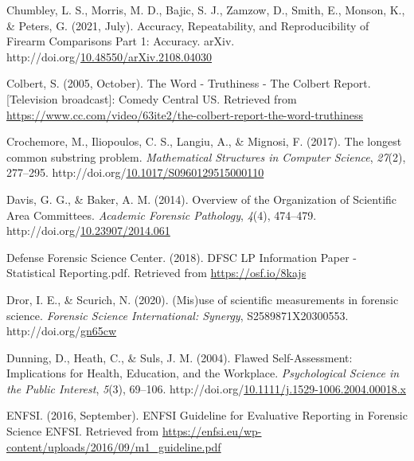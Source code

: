 \documentclass[print]{nuthesis}
\newlength{\cslhangindent}
\newenvironment{CSLReferences}[2]%
{\setlength{\parindent}{0pt}%
\everypar{\setlength{\hangindent}{\cslhangindent}}\ignorespaces}%
{\par}
\begin{document}
\begin{CSLReferences}{1}{0}
\leavevmode{}%
Chumbley, L. S., Morris, M. D., Bajic, S. J., Zamzow, D., Smith, E., Monson, K., \& Peters, G. (2021, July). Accuracy, {Repeatability}, and {Reproducibility} of {Firearm} {Comparisons} {Part} 1: {Accuracy}. arXiv. http://doi.org/\href{https://doi.org/10.48550/arXiv.2108.04030}{10.48550/arXiv.2108.04030}

\leavevmode{}%
Colbert, S. (2005, October). The {Word} - {Truthiness} - {The} {Colbert} {Report}. {[}Television broadcast{]}: {Comedy Central US}. Retrieved from \url{https://www.cc.com/video/63ite2/the-colbert-report-the-word-truthiness}

\leavevmode{}%
Crochemore, M., Iliopoulos, C. S., Langiu, A., \& Mignosi, F. (2017). The longest common substring problem. \emph{Mathematical Structures in Computer Science}, \emph{27}(2), 277--295. http://doi.org/\href{https://doi.org/10.1017/S0960129515000110}{10.1017/S0960129515000110}

\leavevmode{}%
Davis, G. G., \& Baker, A. M. (2014). Overview of the {Organization} of {Scientific} {Area} {Committees}. \emph{Academic Forensic Pathology}, \emph{4}(4), 474--479. http://doi.org/\href{https://doi.org/10.23907/2014.061}{10.23907/2014.061}

\leavevmode{}%
Defense Forensic Science Center. (2018). {DFSC} {LP} {Information} {Paper} - {Statistical} {Reporting}.pdf. Retrieved from \url{https://osf.io/8kajs}

\leavevmode{}%
Dror, I. E., \& Scurich, N. (2020). ({Mis})use of scientific measurements in forensic science. \emph{Forensic Science International: Synergy}, S2589871X20300553. http://doi.org/\href{https://doi.org/gn65cw}{gn65cw}

\leavevmode{}%
Dunning, D., Heath, C., \& Suls, J. M. (2004). Flawed {Self}-{Assessment}: {Implications} for {Health}, {Education}, and the {Workplace}. \emph{Psychological Science in the Public Interest}, \emph{5}(3), 69--106. http://doi.org/\href{https://doi.org/10.1111/j.1529-1006.2004.00018.x}{10.1111/j.1529-1006.2004.00018.x}

\leavevmode{}%
ENFSI. (2016, September). {ENFSI} {Guideline} for {Evaluative} {Reporting} in {Forensic} {Science} {\textbar} {ENFSI}. Retrieved from \url{https://enfsi.eu/wp-content/uploads/2016/09/m1_guideline.pdf}


\end{CSLReferences}
\end{document}

